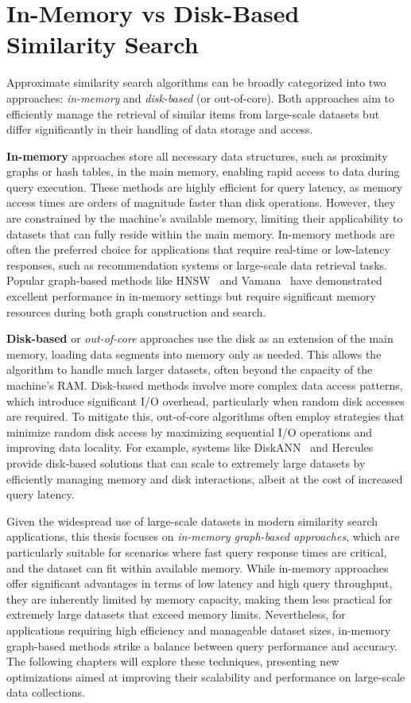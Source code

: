 \section{In-Memory vs Disk-Based Similarity Search}

Approximate similarity search algorithms can be broadly categorized into two approaches: \textit{in-memory} and \textit{disk-based} (or out-of-core). Both approaches aim to efficiently manage the retrieval of similar items from large-scale datasets but differ significantly in their handling of data storage and access.

\textbf{In-memory} approaches store all necessary data structures, such as proximity graphs or hash tables, in the main memory, enabling rapid access to data during query execution. These methods are highly efficient for query latency, as memory access times are orders of magnitude faster than disk operations. However, they are constrained by the machine's available memory, limiting their applicability to datasets that can fully reside within the main memory. In-memory methods are often the preferred choice for applications that require real-time or low-latency responses, such as recommendation systems or large-scale data retrieval tasks. Popular graph-based methods like HNSW~\cite{hnsw} and Vamana~\cite{vamana} have demonstrated excellent performance in in-memory settings but require significant memory resources during both graph construction and search.

\textbf{Disk-based} or \textit{out-of-core} approaches use the disk as an extension of the main memory, loading data segments into memory only as needed. This allows the algorithm to handle much larger datasets, often beyond the capacity of the machine’s RAM. Disk-based methods involve more complex data access patterns, which introduce significant I/O overhead, particularly when random disk accesses are required. To mitigate this, out-of-core algorithms often employ strategies that minimize random disk access by maximizing sequential I/O operations and improving data locality. For example, systems like DiskANN~\cite{vamana} and Hercules~\cite{hercules} provide disk-based solutions that can scale to extremely large datasets by efficiently managing memory and disk interactions, albeit at the cost of increased query latency.

Given the widespread use of large-scale datasets in modern similarity search applications, this thesis focuses on \textit{in-memory graph-based approaches}, which are particularly suitable for scenarios where fast query response times are critical, and the dataset can fit within available memory. While in-memory approaches offer significant advantages in terms of low latency and high query throughput, they are inherently limited by memory capacity, making them less practical for extremely large datasets that exceed memory limits. Nevertheless, for applications requiring high efficiency and manageable dataset sizes, in-memory graph-based methods strike a balance between query performance and accuracy. The following chapters will explore these techniques, presenting new optimizations aimed at improving their scalability and performance on large-scale data collections.

